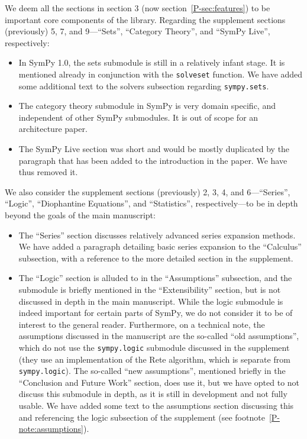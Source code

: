 \documentclass[answers,12pt]{exam}
\begin{document}
\begin{questions}
\begin{solution}
We deem all the sections in section 3 (now section~\ref{P-sec:features}) to be important core
components of the library. Regarding the supplement sections (previously) 5,
7, and 9---``Sets'', ``Category Theory'', and ``SymPy Live'',
respectively:
\begin{itemize}
\item In SymPy 1.0, the sets submodule is still in
a relatively infant stage. It is mentioned already in conjunction with the
\texttt{solveset} function. We have added some additional text to the solvers
subsection regarding \texttt{sympy.sets}.

\item The category theory submodule in SymPy
is very domain specific, and independent of other SymPy submodules. It is out of
scope for an architecture paper.

\item The SymPy Live section was short and would be mostly duplicated by the
  paragraph that has been added to the introduction in the paper. We have thus
  removed it.
\end{itemize}

We also consider the supplement sections (previously) 2, 3, 4, and
6---``Series'', ``Logic'', ``Diophantine Equations'', and ``Statistics'',
respectively---to be in depth beyond the goals of the main manuscript:

\begin{itemize}
\item The ``Series'' section discusses relatively advanced series expansion methods. We
have added a paragraph detailing basic series expansion to the ``Calculus''
subsection, with a reference to the more detailed section in the supplement.

\item The ``Logic'' section is alluded to in the ``Assumptions'' subsection,
  and the submodule is briefly mentioned in the ``Extensibility'' section,
  but is not discussed in depth in the main manuscript. While the logic
  submodule is indeed important for certain parts of SymPy, we do not consider
  it to be of interest to the general reader. Furthermore, on a technical
  note, the assumptions discussed in the manuscript are the so-called ``old
  assumptions'', which do not use the \texttt{sympy.logic} submodule discussed
  in the supplement (they use an implementation of the Rete algorithm, which
  is separate from \texttt{sympy.logic}). The so-called ``new assumptions'',
  mentioned briefly in the ``Conclusion and Future Work'' section, does use
  it, but we have opted to not discuss this submodule in depth, as it is still in
  development and not fully usable. We have added some text to the assumptions
  section discussing this and referencing the logic subsection of the
  supplement (see footnote~\ref{P-note:assumptions}).


\end{itemize}
\end{solution}
\end{questions}
\end{document}
